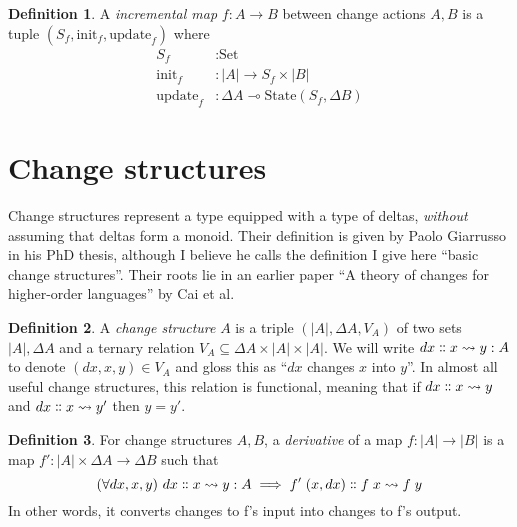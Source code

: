 \documentclass{article}
\theoremstyle{definition}
\newtheorem{definition}{Definition}
\theoremstyle{remark}
\newtheorem{remark}{Remark}
\newcommand\ensuretext[1]{{\ifmmode\text{#1}\else{#1}\fi}}
\newcommand\<\;                 %
\newcommand\quantifierspace{\ }
\newcommand\quantify[1]{({#1})\quantifierspace}
\newcommand\fa[1]{\quantify{\forall #1}}
\newcommand\changes[3]{{#1} \dblcolon {#2} \leadsto {#3}}
\newcommand\D\Delta
\newcommand\init{\text{init}}
\newcommand\update{\text{update}}
\newcommand\Set{\text{Set}}
\newcommand\State{\text{State}}
\newcommand\lto\multimap
\newcommand\todo[1]{\ensuretext{\color{OrangeRed}#1}}
\begin{document}
\begin{definition}
  A \emph{incremental map} $f : A \to B$ between change actions $A,B$ is a tuple $(S_f, \init_f, \update_f)$ where
%
  \begin{align*}
    S_f &: \Set
    \\
    \init_f &: |A| \to S_f \times |B|
    \\
    \update_f &: \D A \lto \State({S_f}, \D B)
  \end{align*}
\end{definition}



\section{Change structures}

Change structures represent a type equipped with a type of deltas, \emph{without} assuming that deltas form a monoid.
Their definition is given by Paolo Giarrusso in his PhD thesis, although I believe he calls the definition I give here ``basic change structures''.
Their roots lie in an earlier paper ``A theory of changes for higher-order languages'' by Cai et al.

\begin{definition}
  A \emph{change structure} $A$ is a triple $(|A|, \Delta A, V_A)$ of two sets $|A|, \Delta A$ and a ternary relation $V_A \subseteq \Delta A \times |A| \times |A|$.
  We will write $\changes{dx}{x}{y} : A$ to denote $(dx, x, y) \in V_A$ and gloss this as ``$dx$ changes $x$ into $y$''.
  In almost all useful change structures, this relation is functional, meaning that if $\changes{dx}{x}{y}$ and $\changes{dx}{x}{y'}$ then $y = y'$.
\end{definition}

\begin{definition}
  For change structures $A,B$, a \emph{derivative} of a map $f : |A| \to |B|$ is a map $f' : |A| \times \D A \to \D B$ such that
%
  \[
  \fa{dx,x,y} \changes{dx}{x}{y} : A \implies \changes{f'\<(x,dx)}{f\<x}{f\<y}
  \]
%
  In other words, it converts changes to f's input into changes to f's output.
\end{definition}
\end{document}
